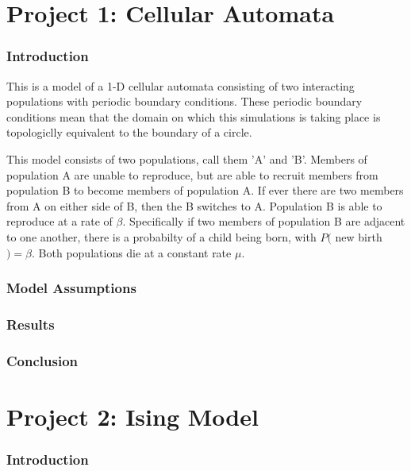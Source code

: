 \documentclass[12pt,letterpaper,cm]{article}
\renewcommand{\.}{\cdot}
\newcommand{\<}{\langle}
\renewcommand{\>}{\rangle}
\begin{document}
	
	\part*{Project 1: Cellular Automata}
	
	
	\section*{Introduction}
	
	This is a model of a 1-D cellular automata consisting of two interacting populations with periodic boundary conditions. These periodic boundary conditions mean that the domain on which this simulations is taking place is topologiclly equivalent to the boundary of a circle.  
	
	This model consists of two populations, call them 'A' and 'B'. Members of population A are unable to reproduce, but are able to recruit members from population B to become members of population A. If ever there are two members from A on either side of B, then the B switches to A. Population B is able to reproduce at a rate of $\beta$. Specifically if two members of population B are adjacent to one another, there is a probabilty of a child being born, with $P($ new birth $) = \beta$. Both populations die at a constant rate $\mu$.
	
	
	
	\section*{Model Assumptions}
	
	
	
	\section*{Results}	
	
	
	
	\section*{Conclusion}
	
	
	
	\newpage
	
	
	
	\part*{Project 2: Ising Model}
	
	
	\section*{Introduction}
	
\end{document}
